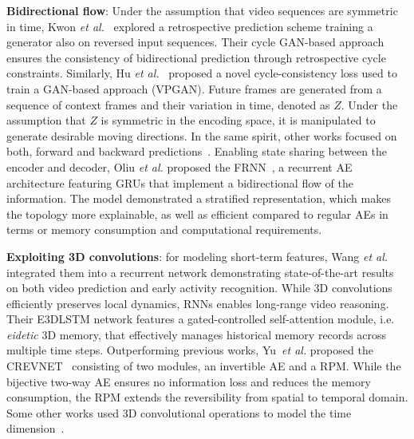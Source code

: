 \vspace*{0.1cm}\noindent\textbf{Bidirectional flow}: Under the assumption that video sequences are symmetric in time, Kwon \textit{et al.}~\cite{Kwon2019} explored a retrospective prediction scheme training a generator also on reversed input sequences. Their cycle \ac{GAN}-based approach ensures the consistency of bidirectional prediction through retrospective cycle constraints. Similarly, Hu \textit{et al.}~\cite{Hu2019} proposed a novel cycle-consistency loss used to train a \ac{GAN}-based approach (VPGAN). Future frames are generated from a sequence of context frames and their variation in time, denoted as $Z$. Under the assumption that $Z$ is symmetric in the encoding space, it is manipulated to generate desirable moving directions. In the same spirit, other works focused on both, forward and backward predictions~\cite{Misra2016,Hou2019}. Enabling state sharing between the encoder and decoder, Oliu \textit{et al.} proposed the \ac{FRNN}~\cite{Oliu2018}, a recurrent \ac{AE} architecture featuring \acp{GRU} that implement a bidirectional flow of the information. The model demonstrated a stratified representation, which makes the topology more explainable, as well as efficient compared to regular \acp{AE} in terms or memory consumption and computational requirements.

\vspace*{0.1cm}\noindent\textbf{Exploiting 3D convolutions}: for modeling short-term features, Wang \textit{et al.}~\cite{Wang2019b} integrated them into a recurrent network demonstrating state-of-the-art results on both video prediction and early activity recognition. While 3D convolutions efficiently preserves local dynamics, \acp{RNN} enables long-range video reasoning. Their \ac{E3DLSTM} network features a gated-controlled self-attention module, i.e. \textit{eidetic} 3D memory, that effectively manages historical memory records across multiple time steps. Outperforming previous works, Yu~\textit{et al.} proposed the \ac{CREVNET}~\cite{Yu2020} consisting of two modules, an invertible \ac{AE} and a \ac{RPM}. While the bijective two-way \ac{AE} ensures no information loss and reduces the memory consumption, the \ac{RPM} extends the reversibility from spatial to temporal domain. Some other works used 3D convolutional operations to model the time dimension~\cite{Aigner2018}.

